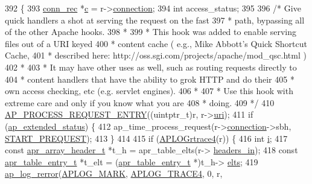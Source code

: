 \begin{DoxyCode}
392 \{
393     \hyperlink{structconn__rec}{conn\_rec} *\hyperlink{group__APACHE__CORE__HTTPD_ga7cce37ef8558e46f408cb4d0f555605b}{c} = r->\hyperlink{structrequest__rec_a0924aae55826638314f76952ca5d60b1}{connection};
394     \textcolor{keywordtype}{int} access\_status;
395 
396     \textcolor{comment}{/* Give quick handlers a shot at serving the request on the fast}
397 \textcolor{comment}{     * path, bypassing all of the other Apache hooks.}
398 \textcolor{comment}{     *}
399 \textcolor{comment}{     * This hook was added to enable serving files out of a URI keyed}
400 \textcolor{comment}{     * content cache ( e.g., Mike Abbott's Quick Shortcut Cache,}
401 \textcolor{comment}{     * described here: http://oss.sgi.com/projects/apache/mod\_qsc.html )}
402 \textcolor{comment}{     *}
403 \textcolor{comment}{     * It may have other uses as well, such as routing requests directly to}
404 \textcolor{comment}{     * content handlers that have the ability to grok HTTP and do their}
405 \textcolor{comment}{     * own access checking, etc (e.g. servlet engines).}
406 \textcolor{comment}{     *}
407 \textcolor{comment}{     * Use this hook with extreme care and only if you know what you are}
408 \textcolor{comment}{     * doing.}
409 \textcolor{comment}{     */}
410     \hyperlink{apache__noprobes_8h_a1e515c8a3ffce6f5a76e7245da3b73cc}{AP\_PROCESS\_REQUEST\_ENTRY}((uintptr\_t)r, r->\hyperlink{structrequest__rec_aee240e90eac55c732891e9408543990b}{uri});
411     \textcolor{keywordflow}{if} (\hyperlink{scoreboard_8h_ab8fc7e9c22bde7df97bb285f4954dc65}{ap\_extended\_status}) \{
412         ap\_time\_process\_request(r->\hyperlink{structrequest__rec_a0924aae55826638314f76952ca5d60b1}{connection}->sbh, \hyperlink{group__hooks_ga2f70b8d11ee2114ee670e7accfe88d72}{START\_PREQUEST});
413     \}
414 
415     \textcolor{keywordflow}{if} (\hyperlink{group__APACHE__CORE__LOG_ga5dc894b606ab0c580215b2f7c94e27ae}{APLOGrtrace4}(r)) \{
416         \textcolor{keywordtype}{int} \hyperlink{group__MOD__PROXY_ga38403a0592eb8018a3ad61aef0f7ca2c}{i};
417         \textcolor{keyword}{const} \hyperlink{structapr__array__header__t}{apr\_array\_header\_t} *t\_h = apr\_table\_elts(r->
      \hyperlink{structrequest__rec_a5497da6c01af49acf70a4a9b975c1c83}{headers\_in});
418         \textcolor{keyword}{const} \hyperlink{structapr__table__entry__t}{apr\_table\_entry\_t} *t\_elt = (\hyperlink{structapr__table__entry__t}{apr\_table\_entry\_t} *)t\_h->
      \hyperlink{structapr__array__header__t_af8462fa2a1ddf6406c66cd3dd441a269}{elts};
419         \hyperlink{group__APACHE__CORE__LOG_ga4c112558ccffd6b363da102b2052d2a6}{ap\_log\_rerror}(\hyperlink{group__APACHE__CORE__LOG_ga655e126996849bcb82e4e5a14c616f4a}{APLOG\_MARK}, \hyperlink{group__APACHE__CORE__LOG_ga479289550d998526187ff78880378f9c}{APLOG\_TRACE4}, 0, r,

\end{DoxyCode}
